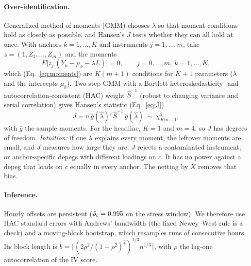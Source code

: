 \paragraph{Over-identification.} Generalized method of moments (GMM) chooses $\lambda$ so that moment conditions hold as
closely as possible, and Hansen's $J$ tests whether they can all hold at once. With anchors $k=1,\dots,K$ and instruments $j=1,\dots,m$, take $z=(1,Z_1,\dots,Z_m)$ and the moments
\begin{equation}
E\big[z_j\,(Y_k-\mu_k-\lambda L)\big]=0,\qquad j=0,\dots,m,\ k=1,\dots,K,
\label{eq:moments}
\end{equation}
which (Eq.~\eqref{eq:moments}) are $K(m+1)$ conditions for $K+1$ parameters ($\lambda$ and the intercepts $\mu_k$). Two-step GMM
with a Bartlett heteroskedasticity- and autocorrelation-consistent (HAC) weight $\hat S^{-1}$ (robust to changing variance and
serial correlation) gives Hansen's statistic (Eq.~\eqref{eq:J})
\begin{equation}
J=n\,\bar g(\hat\lambda)'\,\hat S^{-1}\,\bar g(\hat\lambda)\ \sim\ \chi^2_{Km-1},
\label{eq:J}
\end{equation}
with $\bar g$ the sample moments. For the headline, $K=1$ and $m=4$, so $J$ has \NumGBfxPrimaryJDf{} degrees of freedom.
\emph{Intuition:} if one $\lambda$ explains every moment, the leftover moments are small, and $J$ measures how large they
are. $J$ rejects a contaminated instrument, or anchor-specific depegs with different loadings on $c$. It has no power
against a depeg that loads on $c$ equally in every anchor. The netting by $X$ removes that bias.

\paragraph{Inference.} Hourly offsets are persistent ($\hat\rho_c=0.995{}$ on the stress window). We therefore use HAC standard errors
with Andrews' bandwidth (the fixed Newey--West rule is a check) and a moving-block bootstrap, which resamples runs of consecutive hours. Its block length is
$b=\lceil(2\rho^2/(1-\rho^2)^2)^{1/3}n^{1/3}\rceil$, with $\rho$ the lag-one autocorrelation of the IV score.

